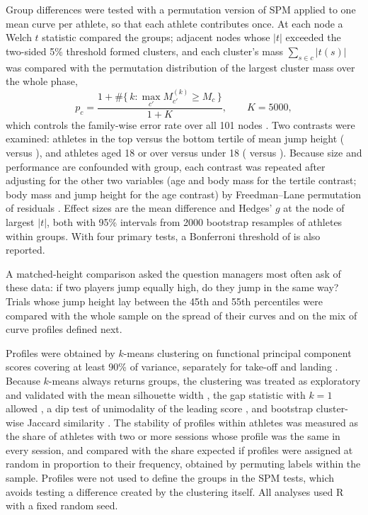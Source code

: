 Group differences were tested with a permutation version of SPM applied to one mean curve per athlete, so that each athlete contributes once. At each node a Welch $t$ statistic compared the groups; adjacent nodes whose $|t|$ exceeded the two-sided 5\% threshold formed clusters, and each cluster's mass $\sum_{s \in c} |t(s)|$ was compared with the permutation distribution of the largest cluster mass over the whole phase,
\begin{equation}
p_c = \frac{1 + \#\{\,k : \max_{c'} M^{(k)}_{c'} \ge M_c\,\}}{1 + K}, \qquad K = 5000,
\label{eq:perm}
\end{equation}
which controls the family-wise error rate over all 101 nodes \parencite{nichols2002,maris2007,pataky2015}. Two contrasts were examined: athletes in the top versus the bottom tertile of mean jump height (\nTop{} versus \nBottom), and athletes aged 18 or over versus under 18 (\nAdult{} versus \nJunior). Because size and performance are confounded with group, each contrast was repeated after adjusting for the other two variables (age and body mass for the tertile contrast; body mass and jump height for the age contrast) by Freedman--Lane permutation of residuals \parencite{winkler2014}. Effect sizes are the mean difference and Hedges' $g$ at the node of largest $|t|$, both with 95\% intervals from 2000 bootstrap resamples of athletes within groups. With four primary tests, a Bonferroni threshold of \bonf{} is also reported.

A matched-height comparison asked the question managers most often ask of these data: if two players jump equally high, do they jump in the same way? Trials whose jump height lay between the 45th and 55th percentiles were compared with the whole sample on the spread of their curves and on the mix of curve profiles defined next.

Profiles were obtained by $k$-means clustering on functional principal component scores covering at least 90\% of variance, separately for take-off and landing \parencite{jacques2014}. Because $k$-means always returns groups, the clustering was treated as exploratory and validated with the mean silhouette width \parencite{kaufman1990}, the gap statistic with $k = 1$ allowed \parencite{tibshirani2001}, a dip test of unimodality of the leading score \parencite{hartigan1985}, and bootstrap cluster-wise Jaccard similarity \parencite{hennig2007}. The stability of profiles within athletes was measured as the share of athletes with two or more sessions whose profile was the same in every session, and compared with the share expected if profiles were assigned at random in proportion to their frequency, obtained by permuting labels within the sample. Profiles were not used to define the groups in the SPM tests, which avoids testing a difference created by the clustering itself. All analyses used R \parencite{rcore2026} with a fixed random seed.

